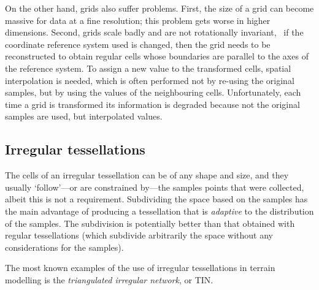 On the other hand, grids also suffer problems.
First, the size of a grid can become massive for data at a fine resolution; this problem gets worse in higher dimensions.
Second, grids scale badly and are not rotationally invariant, \ie\ if the coordinate reference system used is changed, then the grid needs to be reconstructed to obtain regular cells whose boundaries are parallel to the axes of the reference system.
To assign a new value to the transformed cells, spatial interpolation is needed, which is often performed not by re-using the original samples, but by using the values of the neighbouring cells.
Unfortunately, each time a grid is transformed its information is degraded because not the original samples are used, but interpolated values.



\subsection{Irregular tessellations} 

The cells of an irregular tessellation can be of any shape and size, and they usually `follow'---or are constrained by---the samples points that were collected, albeit this is not a requirement. 
Subdividing the space based on the samples has the main advantage of producing a tessellation that is \emph{adaptive} to the distribution of the samples. 
The subdivision is potentially better than that obtained with regular tessellations (which subdivide arbitrarily the space without any considerations for the samples).

%

The most known examples of the use of irregular tessellations in terrain modelling is the \emph{triangulated irregular network}, or TIN\@.%

